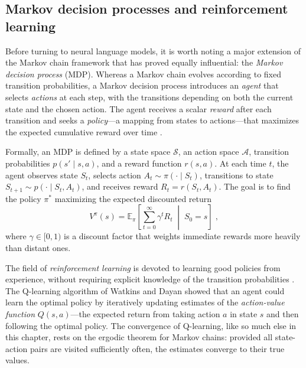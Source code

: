 \subsection{Markov decision processes and reinforcement learning}

Before turning to neural language models, it is worth noting a major extension of the Markov chain framework that has proved equally influential: the \textit{Markov decision process} (MDP). Whereas a Markov chain evolves according to fixed transition probabilities, a Markov decision process introduces an \textit{agent} that selects \textit{actions} at each step, with the transitions depending on both the current state and the chosen action. The agent receives a scalar \textit{reward} after each transition and seeks a \textit{policy}---a mapping from states to actions---that maximizes the expected cumulative reward over time \cite{bellman_1957_dynamic, puterman_1994_mdp}.

\medskip

Formally, an MDP is defined by a state space $\mathcal{S}$, an action space $\mathcal{A}$, transition probabilities $p(s' \mid s, a)$, and a reward function $r(s, a)$. At each time $t$, the agent observes state $S_t$, selects action $A_t \sim \pi(\cdot \mid S_t)$, transitions to state $S_{t+1} \sim p(\cdot \mid S_t, A_t)$, and receives reward $R_t = r(S_t, A_t)$. The goal is to find the policy $\pi^*$ maximizing the expected discounted return
\begin{equation}
    V^\pi(s) = \mathbb{E}_\pi\!\left[\sum_{t=0}^\infty \gamma^t R_t \;\middle|\; S_0 = s\right] \; ,
\end{equation}
where $\gamma \in [0, 1)$ is a discount factor that weights immediate rewards more heavily than distant ones.

\medskip

The field of \textit{reinforcement learning} is devoted to learning good policies from experience, without requiring explicit knowledge of the transition probabilities \cite{sutton_2018_reinforcement}. The Q-learning algorithm of Watkins and Dayan \cite{watkins_1992_qlearning} showed that an agent could learn the optimal policy by iteratively updating estimates of the \textit{action-value function} $Q(s, a)$---the expected return from taking action $a$ in state $s$ and then following the optimal policy. The convergence of Q-learning, like so much else in this chapter, rests on the ergodic theorem for Markov chains: provided all state-action pairs are visited sufficiently often, the estimates converge to their true values.

